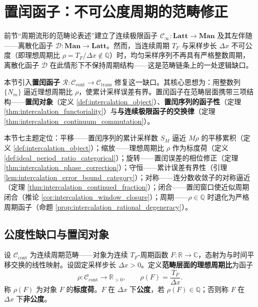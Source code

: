 \section{置闰函子：不可公度周期的范畴修正}\label{sec:intercalation_functor}

\begin{remark}[本节定位]\label{rem:intercalation_functor_positioning}
前节“周期流形的范畴论表述”建立了连续极限函子 $\mathcal{C}_\infty:\mathbf{Latt}\to\mathbf{Man}$ 及其左伴随——离散化函子 $\mathcal{D}:\mathbf{Man}\to\mathbf{Latt}$。然而，当连续周期 $T_F$ 与采样步长 $\Delta x$ 不可公度（即理想周期比 $\rho = T_F/\Delta x \notin \mathbb{Q}$）时，均匀采样序列不再具有严格整数周期，离散化函子 $\mathcal{D}$ 在此情形下不保持周期结构——这是范畴链条上的一处逻辑缺口。

本节引入\textbf{置闰函子} $\mathcal{R}:\mathcal{C}_{\text{cont}}\to\mathcal{C}_{\text{trans}}$ 修复这一缺口。其核心思想为：用整数列 $\{N_m\}$ 逼近理想周期比 $\rho$，使累计采样误差有界。置闰函子在范畴层面携带三项结构——\textbf{置闰对象}（定义 \ref{def:intercalation_object}）、\textbf{置闰序列的函子性}（定理 \ref{thm:intercalation_functoriality}）与\textbf{与连续极限函子的交换律}（定理 \ref{thm:intercalation_continuum_commutation}）。

本节七主题定位：平移——置闰序列的累计采样数 $S_M$ 逼近 $M\rho$ 的平移累积（定义 \ref{def:intercalation_object}）；缩放——理想周期比 $\rho$ 作为标度荷（定义 \ref{def:ideal_period_ratio_categorical}）；旋转——置闰误差的相位修正（定理 \ref{thm:intercalation_phase_correction}）；守恒——累计误差有界性（引理 \ref{lem:intercalation_error_bound_category}）；对称——连分数收敛子的对称逼近（定理 \ref{thm:intercalation_continued_fraction}）；闭合——置闰窗口使近似周期闭合（推论 \ref{cor:intercalation_window_closure}）；周期——$\rho \in \mathbb{Q}$ 时退化为严格周期函子（命题 \ref{prop:intercalation_rational_degeneracy}）。
\end{remark}

\subsection{公度性缺口与置闰对象}

\begin{definition}[范畴层面的理想周期比]\label{def:ideal_period_ratio_categorical}
设 $\mathcal{C}_{\text{cont}}$ 为连续周期范畴——对象为连续 $T_F$-周期函数 $F:\mathbb{R}\to\mathbb{C}$，态射为与时间平移交换的线性映射。设固定采样步长 $\Delta x > 0$。定义\textbf{范畴层面的理想周期比}为函子
\[
\rho:\mathcal{C}_{\text{cont}}\to\mathbb{R}_{>0},\qquad
\rho(F)=\frac{T_F}{\Delta x}.
\]
称 $\rho(F)$ 为对象 $F$ 的\textbf{标度荷}。$F$ 在 $\Delta x$ 下\textbf{公度}，若 $\rho(F)\in\mathbb{Q}$；否则称 $F$ 在 $\Delta x$ 下\textbf{非公度}。
\end{definition}

